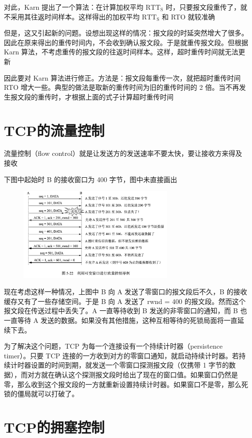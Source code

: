 \documentclass[cs4size,a4paper,10pt]{ctexart}
\begin{document}
	对此，Karn 提出了一个算法：在计算加权平均 $\mathrm{RTT_S}$ 时，只要报文段重传了，就不采用其往返时间样本。这样得出的加权平均 $\mathrm{RTT_S}$ 和 RTO 就较准确

	但是，这又引起新的问题。设想出现这样的情况：报文段的时延突然增大了很多。因此在原来得出的重传时间内，不会收到确认报文段。于是就重传报文段。但根据 Karn 算法，不考虑重传的报文段的往返时间样本。这样，超时重传时间就无法更新

	因此要对 Karn 算法进行修正。方法是：报文段每重传一次，就把超时重传时间 RTO 增大一些。典型的做法是取新的重传时间为旧的重传时间的 2 倍。当不再发生报文段的重传时，才根据上面的式子计算超时重传时间

	\section{TCP的流量控制}
	流量控制（flow control）就是让发送方的发送速率不要太快，要让接收方来得及接收

	下图中起始时 B 的接收窗口为 400 字节，图中未直接画出
	\begin{figure}[H]
		\centering
		\includegraphics[width=0.7\textwidth]{img/5.22}
	\end{figure}

	现在考虑这样一种情况，上图中 B 向 A 发送了零窗口的报文段后不久，B 的接收缓存又有了一些存储空间。于是 B 向 A 发送了 rwnd = 400 的报文段。然而这个报文段在传送过程中丢失了。A 一直等待收到 B 发送的非零窗口的通知，而 B 也一直等待 A 发送的数据。如果没有其他措施，这种互相等待的死锁局面将一直延续下去。

	为了解决这个问题，TCP 为每一个连接设有一个持续计时器（persistence timer）。只要 TCP 连接的一方收到对方的零窗口通知，就启动持续计时器。若持续计时器设置的时间到期，就发送一个零窗口探测报文段（仅携带 1 字节的数据），而对方就在确认这个探测报文段时给出了现在的窗口值。如果窗口仍然是零，那么收到这个报文段的一方就重新设置持续计时器。如果窗口不是零，那么死锁的僵局就可以打破了。

	\section{TCP的拥塞控制}
\end{document}
